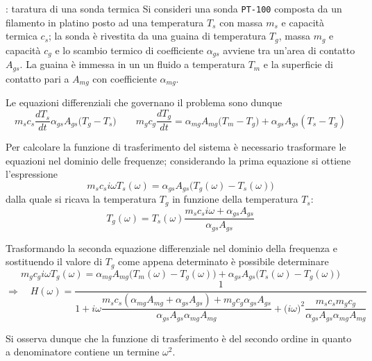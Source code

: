 	\begin{esempio}{: taratura di una sonda termica}
		Si consideri una sonda \texttt{PT-100} composta da un filamento in platino posto ad una temperatura $T_s$ con massa $m_s$ e capacità termica $c_s$; la sonda è rivestita da una guaina di temperatura $T_g$, massa $m_g$ e capacità $c_g$ e lo scambio termico di coefficiente $\alpha_{gs}$ avviene tra un'area di contatto $A_{gs}$. La guaina è immessa in un un fluido a temperatura $T_m$ e la superficie di contatto pari a $A_{mg}$ con coefficiente $\alpha_{mg}$.
		
		Le equazioni differenziali che governano il problema sono dunque
		\[ m_s c_s \frac{dT_s}{dt} \alpha_{gs} A_{gs} \big(T_g -T_s\big) \qquad m_g c_g \frac{dT_g}{dt} = \alpha_{mg} A_{mg} \big(T_m-T_g\big) + \alpha_{gs}A_{gs}(T_s- T_g)\]
		
		Per calcolare la funzione di trasferimento del sistema è necessario trasformare le equazioni nel dominio delle frequenze; considerando la prima equazione si ottiene l'espressione
		\[m_s c_s i\omega T_s(\omega) = \alpha_{gs} A_{gs}\Big( T_{g}(\omega) - T_{s}(\omega)\Big) \]
		dalla quale si ricava la temperatura $T_g$ in funzione della temperatura $T_s$:
		\[ T_g(\omega) = T_s(\omega) \frac{m_s c_s i\omega + \alpha_{gs} A_{gs}}{\alpha_{gs}A_{gs}} \]
		
		Trasformando la seconda equazione differenziale nel dominio della frequenza e sostituendo il valore di $T_g$ come appena determinato è possibile determinare
		\[ m_g c_g i\omega T_g(\omega) = \alpha_{mg} A_{mg} \Big(T_m(\omega) - T_g(\omega)\Big) + \alpha_{gs} A_{gs} \Big(T_s(\omega) - T_g(\omega)\Big) \]
		\[ \Rightarrow \quad H(\omega) = \frac 1 {1 + i\omega \dfrac{m_s c_s (\alpha_{mg} A_{mg} + \alpha_{gs} A_{gs} ) + m_g c_g \alpha_{gs} A_{gs} }{\alpha_{gs} A_{gs}\alpha_{mg} A_{mg} }  + \big(i\omega\big)^2 \dfrac{m_s c_s m_g c_g}{\alpha_{gs} A_{gs} \alpha_{mg} A_{mg} } } \]
		
		Si osserva dunque che la funzione di trasferimento è del secondo ordine in quanto a denominatore contiene un termine $\omega^2$.
		
	\end{esempio}
	
	
	
	
	
	
	
	
	
	
	
	
	
	
	
	
	
	
	
	
	
	
	